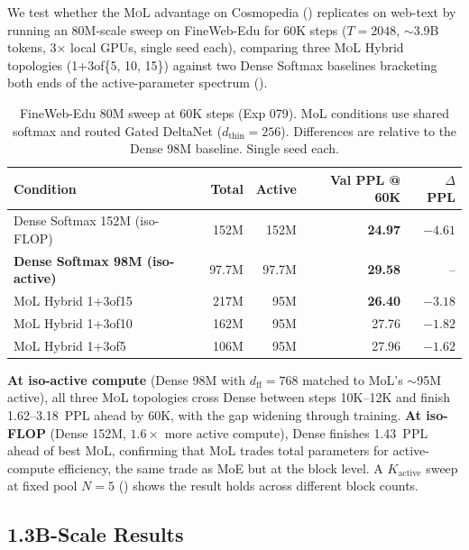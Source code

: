 \documentclass[10pt]{article}
\newcommand{\mol}{\textsc{MoL}}
\newcommand{\dthin}{d_\text{thin}}
\begin{document}
We test whether the \mol{} advantage on Cosmopedia () replicates on web-text by running an 80M-scale sweep on FineWeb-Edu for 60K steps ($T{=}2048$, $\sim$3.9B tokens, 3$\times$ local GPUs, single seed each), comparing three \mol{} Hybrid topologies (1+3of\{5, 10, 15\}) against two Dense Softmax baselines bracketing both ends of the active-parameter spectrum ().

\begin{table}[h]
\centering
\caption{FineWeb-Edu 80M sweep at 60K steps (Exp 079). MoL conditions use shared softmax and routed Gated DeltaNet ($\dthin{=}256$). Differences are relative to the Dense 98M baseline. Single seed each.}
\label{tab:fineweb_80m}
\small
\begin{tabular}{lrrrr}
\toprule
Condition & Total & Active & Val PPL @ 60K & $\Delta$ PPL \\
\midrule
Dense Softmax 152M (iso-FLOP)        & 152M  & 152M  & \textbf{24.97} & $-4.61$ \\
\textbf{Dense Softmax 98M (iso-active)} & 97.7M & 97.7M & \textbf{29.58} & --      \\
\mol{} Hybrid 1+3of15                 & 217M  & 95M   & \textbf{26.40} & $-3.18$ \\
\mol{} Hybrid 1+3of10                 & 162M  & 95M   & 27.76          & $-1.82$ \\
\mol{} Hybrid 1+3of5                  & 106M  & 95M   & 27.96          & $-1.62$ \\
\bottomrule
\end{tabular}
\end{table}

\textbf{At iso-active compute} (Dense 98M with $d_\textrm{ff}{=}768$ matched to MoL's $\sim$95M active), all three \mol{} topologies cross Dense between steps 10K--12K and finish 1.62--3.18~PPL ahead by 60K, with the gap widening through training.
\textbf{At iso-FLOP} (Dense 152M, $1.6\times$ more active compute), Dense finishes 1.43~PPL ahead of best \mol{}, confirming that \mol{} trades total parameters for active-compute efficiency, the same trade as MoE but at the block level. A $K_\textrm{active}$ sweep at fixed pool $N{=}5$ () shows the result holds across different block counts.

\subsection{1.3B-Scale Results}
\label{sec:1p3b}
\end{document}
